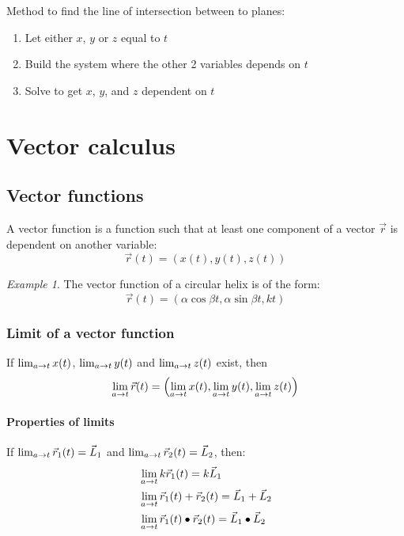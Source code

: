 \documentclass[10pt, twocolumn]{article}
\theoremstyle{remark}
\newtheorem*{example}{Example}
\begin{document}
Method to find the line of intersection between to planes:
\begin{enumerate}
  \item Let either \(x\), \(y\) or \(z\) equal to \(t\)
  \item Build the system where the other 2 variables depends on \(t\)
  \item Solve to get \(x\), \(y\), and \(z\) dependent on \(t\)
\end{enumerate}

\addtocounter{section}{1}
\section{Vector calculus}
\subsection{Vector functions}
A vector function is a function such that at least one component of a vector \(\vec{r}\) is dependent on another variable:
\[
  \vec{r}(t) = \left( x(t), y(t), z(t) \right)
\]
\begin{example}
  The vector function of a circular helix is of the form:
  \[
    \vec{r}(t) = \left( \alpha\cos\beta t, \alpha\sin\beta t, kt \right)
  \]
\end{example}

\subsubsection*{Limit of a vector function}
If \(\lim_{a \to t}{x(t)}\), \(\lim_{a \to t}{y(t)}\) and \(\lim_{a \to t}{z(t)}\) exist, then
\[
  \lim_{a \to t}{\vec{r}(t)} = \left( \lim_{a \to t}{x(t)}, \lim_{a \to t}{y(t)}, \lim_{a \to t}{z(t)} \right)
\]

\paragraph*{Properties of limits}
If \(\lim_{a \to t}{\vec{r}_1 (t)} = \vec{L}_1 \) and \(\lim_{a \to t}{\vec{r}_2 (t)} = \vec{L}_2 \), then:
\begin{align*}
   & \lim_{a \to t}{k\vec{r}_1 (t)} = k\vec{L}_1                                        \\
   & \lim_{a \to t}{\vec{r}_1 (t) + \vec{r}_2 (t)} = \vec{L}_1 + \vec{L}_2             \\
   & \lim_{a \to t}{\vec{r}_1 (t) \bullet \vec{r}_2 (t)} = \vec{L}_1 \bullet \vec{L}_2
\end{align*}
\end{document}
